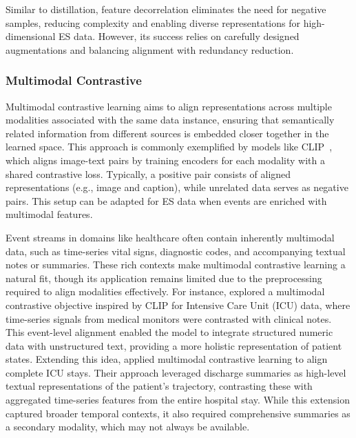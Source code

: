 \documentclass[twoside,11pt]{article}
\begin{document}
Similar to distillation, feature decorrelation eliminates the need for negative samples, reducing complexity and enabling diverse representations for high-dimensional ES data. However, its success relies on carefully designed augmentations and balancing alignment with redundancy reduction. %

\subsubsection{Multimodal Contrastive}
\label{subsubsec:multimodal-contrastive}

Multimodal contrastive learning aims to align representations across multiple modalities associated with the same data instance, ensuring that semantically related information from different sources is embedded closer together in the learned space. This approach is commonly exemplified by models like CLIP~, which aligns image-text pairs by training encoders for each modality with a shared contrastive loss. Typically, a positive pair consists of aligned representations (e.g., image and caption), while unrelated data serves as negative pairs. This setup can be adapted for ES data when events are enriched with multimodal features.

Event streams in domains like healthcare often contain inherently multimodal data, such as time-series vital signs, diagnostic codes, and accompanying textual notes or summaries. These rich contexts make multimodal contrastive learning a natural fit, though its application remains limited due to the preprocessing required to align modalities effectively.
For instance,  explored a multimodal contrastive objective inspired by CLIP for Intensive Care Unit (ICU) data, where time-series signals from medical monitors were contrasted with clinical notes. This event-level alignment enabled the model to integrate structured numeric data with unstructured text, providing a more holistic representation of patient states. Extending this idea,  applied multimodal contrastive learning to align complete ICU stays. Their approach leveraged discharge summaries as high-level textual representations of the patient’s trajectory, contrasting these with aggregated time-series features from the entire hospital stay. While this extension captured broader temporal contexts, it also required comprehensive summaries as a secondary modality, which may not always be available.
\end{document}

